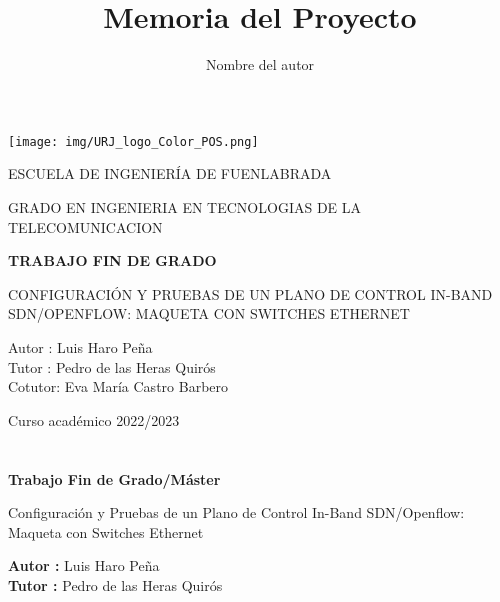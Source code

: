 \documentclass[a4paper, 12pt]{book}
\title{Memoria del Proyecto}
\author{Nombre del autor}
\begin{document}
	
	\renewcommand{\refname}{Bibliografía}  %
	\renewcommand{\appendixname}{Apéndice}
	
	
	
	\begin{titlepage}
		\begin{center}
			\texttt{[image: img/URJ\_logo\_Color\_POS.png]}
			
			\vspace{1.75cm}
			
			\LARGE
			ESCUELA DE INGENIERÍA DE FUENLABRADA
			\vspace{1cm}
			
			\LARGE
			GRADO EN INGENIERIA EN TECNOLOGIAS DE LA TELECOMUNICACION
			
			\vspace{1cm}
			\LARGE
			\textbf{TRABAJO FIN DE GRADO}
			
			\vspace{1cm}
			
			\Large
			CONFIGURACIÓN Y PRUEBAS DE UN PLANO DE CONTROL IN-BAND SDN/OPENFLOW: MAQUETA CON SWITCHES ETHERNET  
			
			\vspace{2cm}
			
			\large
			Autor : Luis Haro Peña \\
			Tutor : Pedro de las Heras Quirós\\
			Cotutor: Eva María Castro Barbero
			\vspace{1cm}
			
			\large
			Curso académico 2022/2023
			
		\end{center}
	\end{titlepage}
	
	\newpage
	\mbox{}
	\thispagestyle{empty} %
	
	
	
	\clearpage
	\chapter*{}
	
	\vspace{-4cm}
	\begin{center}
		\LARGE
		\textbf{Trabajo Fin de Grado/Máster}
		
		\vspace{1cm}
		\large
		Configuración y Pruebas de un Plano de Control In-Band SDN/Openflow: Maqueta con Switches Ethernet
		
		\vspace{1cm}
		\large
		\textbf{Autor :} Luis Haro Peña \\
		\textbf{Tutor :} Pedro de las Heras Quirós
		
	\end{center}
	
\end{document}
